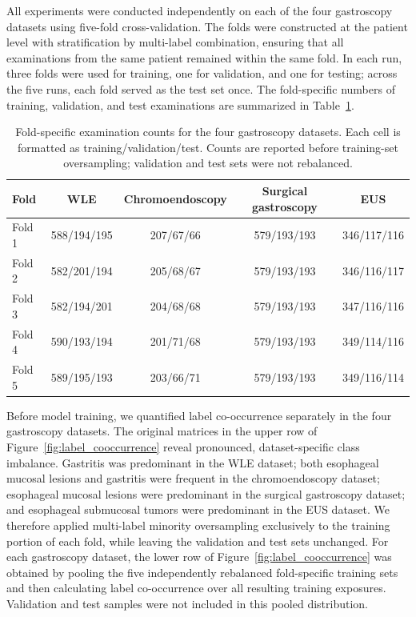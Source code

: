 \documentclass[Afour,sagev,times]{sagej}
\begin{document}
All experiments were conducted independently on each of the four gastroscopy datasets using five-fold cross-validation. The folds were constructed at the patient level with stratification by multi-label combination, ensuring that all examinations from the same patient remained within the same fold. In each run, three folds were used for training, one for validation, and one for testing; across the five runs, each fold served as the test set once. The fold-specific numbers of training, validation, and test examinations are summarized in Table~\ref{T1}.

\begin{table}[h]
\small\sf\centering
\caption{Fold-specific examination counts for the four gastroscopy datasets. Each cell is formatted as training/validation/test. Counts are reported before training-set oversampling; validation and test sets were not rebalanced.\label{T1}}
\begin{tabular}{lcccc}
\toprule
Fold & WLE & Chromoendoscopy & Surgical gastroscopy & EUS \\
\midrule
Fold 1 & 588/194/195 & 207/67/66 & 579/193/193 & 346/117/116 \\
Fold 2 & 582/201/194 & 205/68/67 & 579/193/193 & 346/116/117 \\
Fold 3 & 582/194/201 & 204/68/68 & 579/193/193 & 347/116/116 \\
Fold 4 & 590/193/194 & 201/71/68 & 579/193/193 & 349/114/116 \\
Fold 5 & 589/195/193 & 203/66/71 & 579/193/193 & 349/116/114 \\
\bottomrule
\end{tabular}
\end{table}

Before model training, we quantified label co-occurrence separately in the four gastroscopy datasets. The original matrices in the upper row of Figure~\ref{fig:label_cooccurrence} reveal pronounced, dataset-specific class imbalance. Gastritis was predominant in the WLE dataset; both esophageal mucosal lesions and gastritis were frequent in the chromoendoscopy dataset; esophageal mucosal lesions were predominant in the surgical gastroscopy dataset; and esophageal submucosal tumors were predominant in the EUS dataset. We therefore applied multi-label minority oversampling exclusively to the training portion of each fold, while leaving the validation and test sets unchanged. For each gastroscopy dataset, the lower row of Figure~\ref{fig:label_cooccurrence} was obtained by pooling the five independently rebalanced fold-specific training sets and then calculating label co-occurrence over all resulting training exposures. Validation and test samples were not included in this pooled distribution.
\end{document}
